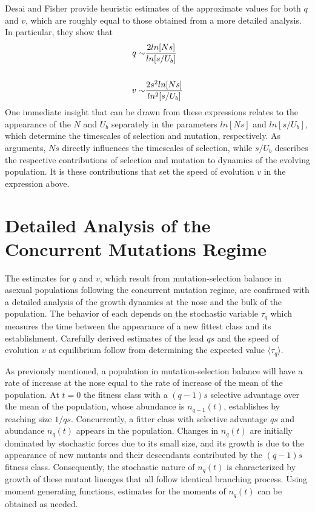 \documentclass[12pt, two column]{article}
\begin{document}
Desai and Fisher provide heuristic estimates of the approximate values for both $q$ and $v$, which are roughly equal to those obtained from a more detailed analysis.  In particular, they show that
\begin{equation}
\begin{aligned}
q \sim & {2ln[Ns] \over ln[s/U_b]} \\   
\\
v \sim & {2s^2ln[Ns] \over ln^2[s/U_b]}
\end{aligned}
\end{equation}
One immediate insight that can be drawn from these expressions relates to the appearance of the $N$ and $U_b$ separately in the parameters $ln[Ns]$ and $ln[s/U_b]$, which determine the timescales of selection and mutation, respectively.  As arguments, $Ns$ directly influences the timescales of selection, while $s/U_b$ describes the respective contributions of selection and mutation to dynamics of the evolving population.  It is these contributions that set the speed of evolution $v$ in the expression above.   

\section*{Detailed Analysis of the Concurrent Mutations Regime}
The estimates for $q$ and $v$, which result from mutation-selection balance in asexual populations following the concurrent mutation regime, are confirmed with a detailed analysis of the growth dynamics at the nose and the bulk of the population.  The behavior of each depends on the stochastic variable $\tau_q$ which measures the time between the appearance of a new fittest class and its establishment.  Carefully derived estimates of the lead $qs$ and the speed of evolution $v$ at equilibrium follow from determining the expected value $\langle \tau_q \rangle$.   

As previously mentioned, a population in mutation-selection balance will have a rate of increase at the nose equal to the rate of increase of the mean of the population.  At $t=0$ the fitness class with a $(q-1)s$ selective advantage over the mean of the population, whose abundance is $n_{q-1}(t)$, establishes by reaching size $1/qs$.  Concurrently, a fitter class with selective advantage $qs$ and abundance $n_q(t)$ appears in the population.  Changes in $n_q(t)$ are initially dominated by stochastic forces due to its small size, and its growth is due to the appearance of new mutants and their descendants contributed by the $(q-1)s$ fitness class. Consequently, the stochastic nature of $n_q(t)$ is characterized by growth of these mutant lineages that all follow identical branching process.  Using moment generating functions, estimates for the moments of $n_q(t)$ can be obtained as needed.
\end{document}

